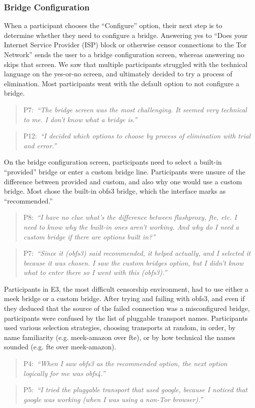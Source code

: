 \documentclass[USenglish,oneside,twocolumn]{article}
\newcommand{\pquote}[2]{
\begin{quotation}
\noindent #1:~\textit{``#2''}
\end{quotation}
}
\begin{document}
\subsubsection{Bridge Configuration} 
When a participant chooses the ``Configure'' option, their next step is to determine whether they need to configure a bridge. Answering yes to ``Does your Internet Service Provider (ISP) block or otherwise censor connections to the Tor Network'' sends the user to a bridge configuration screen, whereas answering no skips that screen. We saw that multiple participants struggled with the technical language on the yes-or-no screen, and ultimately decided to try a process of elimination. Most participants went with the default option to not configure a bridge. 

\pquote{P7}{The bridge screen was the most challenging. It seemed very technical to me. I don't know what a bridge is.}
\pquote{P12}{I decided which options to choose by process of elimination with trial and error.}

On the bridge configuration screen, participants need to select a built-in ``provided'' bridge or enter a custom bridge line. Participants were unsure of the difference between provided and custom, and also why one would use a custom bridge. Most chose the built-in obfs3 bridge, which the interface marks as ``recommended.''

\pquote{P8}{I have no clue what's the difference between flashproxy, fte, etc. I need to know why the built-in ones aren't working. And why do I need a custom bridge if there are options built in?}
\pquote{P7}{Since it (obfs3) said recommended, it helped actually, and I selected it because it was chosen. I saw the custom bridges option, but I didn't know what to enter there so I went with this (obfs3).}

Participants in E3, the most difficult censorship environment, had to use either a meek bridge or a custom bridge. After trying and failing with obfs3, and even if they deduced that the source of the failed connection was a misconfigured bridge, participants were confused by the list of pluggable transport names. Participants used various selection strategies, choosing transports at random, in order, by name familiarity (e.g. meek-amazon over fte), or by how technical the names sounded (e.g. fte over meek-amazon). 

\pquote{P4}{When I saw obfs3 as the recommended option, the next option logically for me was obfs4.}
\pquote{P5}{I tried the pluggable transport that used google, because I noticed that google was working (when I was using a non-Tor browser).}
\end{document}

